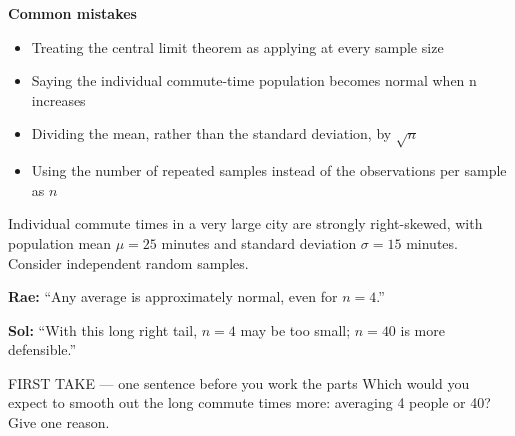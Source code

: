 \documentclass[11pt]{article}
\begin{document}
\textbf{Common mistakes}
\begin{itemize}[leftmargin=1.5em,itemsep=2pt,topsep=2pt]
  \item Treating the central limit theorem as applying at every sample size
  \item Saying the individual commute-time population becomes normal when n increases
  \item Dividing the mean, rather than the standard deviation, by $\sqrt{n}$
  \item Using the number of repeated samples instead of the observations per sample as $n$
\end{itemize}

\clearpage
{}

Individual commute times in a very large city are strongly right-skewed, with population mean $\mu=25$ minutes and standard deviation $\sigma=15$ minutes. Consider independent random samples.\par\smallskip \textbf{Rae:} ``Any average is approximately normal, even for $n=4$.''\par \textbf{Sol:} ``With this long right tail, $n=4$ may be too small; $n=40$ is more defensible.''\par
\begin{center}
\end{center}
\begin{firsttakebox}{FIRST TAKE --- one sentence before you work the parts}
Which would you expect to smooth out the long commute times more: averaging 4 people or 40? Give one reason.\par
{}
\end{firsttakebox}
\end{document}
